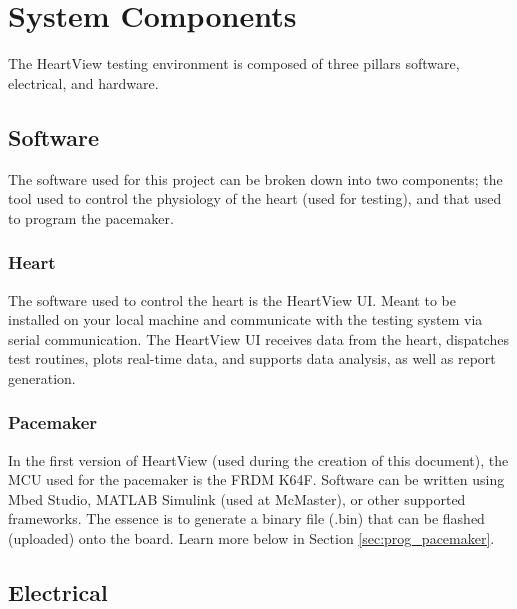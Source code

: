 \documentclass[11pt,fleqn]{book} %
\begin{document}
\section{System Components}

The HeartView testing environment is composed of three pillars software, electrical, and hardware. 


\subsection{Software}

The software used for this project can be broken down into two components; the tool used to control the physiology of the heart (used for testing), and that used to program the pacemaker.


\subsubsection{Heart}

The software used to control the heart is the HeartView UI. Meant to be installed on your local machine and communicate with the testing system via serial communication. The HeartView UI receives data from the heart, dispatches test routines, plots real-time data, and supports data analysis, as well as report generation.


\subsubsection{Pacemaker}

In the first version of HeartView (used during the creation of this document), the \ac{MCU} used for the pacemaker is the FRDM K64F. Software can be written using Mbed Studio, MATLAB Simulink (used at McMaster), or other supported frameworks. The essence is to generate a binary file (.bin) that can be flashed (uploaded) onto the board. Learn more below in Section \ref{sec:prog_pacemaker}.



\subsection{Electrical}
\end{document}
